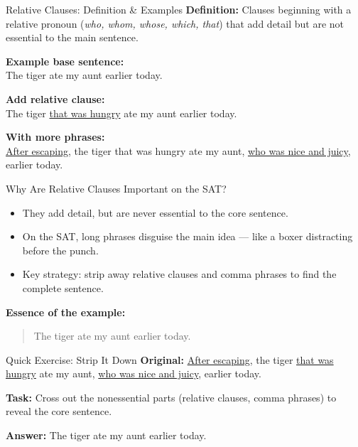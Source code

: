 \documentclass[aspectratio=169,11pt]{beamer}
\begin{document}
\begin{frame}{Relative Clauses: Definition \& Examples}
\small
\textbf{Definition:} Clauses beginning with a relative pronoun (\emph{who, whom, whose, which, that}) that add detail but are not essential to the main sentence.  

\vspace{0.5em}
\textbf{Example base sentence:} \\
The tiger ate my aunt earlier today.

\vspace{0.5em}
\textbf{Add relative clause:} \\
The tiger \underline{that was hungry} ate my aunt earlier today.  

\vspace{0.5em}
\textbf{With more phrases:} \\
\underline{After escaping}, the tiger that was hungry ate my aunt, \underline{who was nice and juicy}, earlier today.
\end{frame}

\begin{frame}{Why Are Relative Clauses Important on the SAT?}
\begin{itemize}
  \item They add detail, but are never essential to the core sentence.
  \item On the SAT, long phrases disguise the main idea — like a boxer distracting before the punch.
  \item Key strategy: strip away relative clauses and comma phrases to find the complete sentence.
\end{itemize}

\vspace{0.5em}
\textbf{Essence of the example:}  
\begin{quote}
The tiger ate my aunt earlier today.
\end{quote}
\end{frame}

\begin{frame}{Quick Exercise: Strip It Down}
\small
\textbf{Original:}  
\underline{After escaping}, the tiger \underline{that was hungry} ate my aunt, \underline{who was nice and juicy}, earlier today.

\vspace{0.8em}
\textbf{Task:} Cross out the nonessential parts (relative clauses, comma phrases) to reveal the core sentence.

\vspace{0.8em}
\textbf{Answer:}  
The tiger ate my aunt earlier today.
\end{frame}
\end{document}
